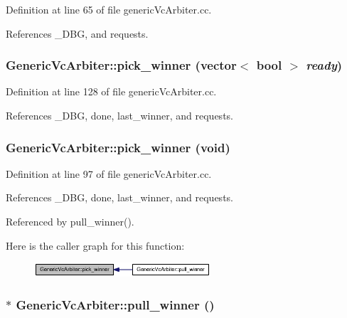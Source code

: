 Definition at line 65 of file genericVcArbiter.cc.

References \_\-DBG, and requests.
\subsubsection[{pick\_\-winner}]{ GenericVcArbiter::pick\_\-winner (vector$<$ bool $>$ {\em ready})}\label{classGenericVcArbiter_d5d1e1d3532c52f4e3cdb92ab2a235ec}




Definition at line 128 of file genericVcArbiter.cc.

References \_\-DBG, done, last\_\-winner, and requests.
\subsubsection[{pick\_\-winner}]{ GenericVcArbiter::pick\_\-winner (void)}\label{classGenericVcArbiter_55ce40bdf8fa7c2ea448ee5aa5c50921}




Definition at line 97 of file genericVcArbiter.cc.

References \_\-DBG, done, last\_\-winner, and requests.

Referenced by pull\_\-winner().

Here is the caller graph for this function:\nopagebreak
\begin{figure}[H]
\begin{center}
\leavevmode
\includegraphics[width=186pt]{classGenericVcArbiter_55ce40bdf8fa7c2ea448ee5aa5c50921_icgraph}
\end{center}
\end{figure}
\subsubsection[{pull\_\-winner}]{ $\ast$ GenericVcArbiter::pull\_\-winner ()}\label{classGenericVcArbiter_af615d6c6a206070c87e2ecdf82a717d}




